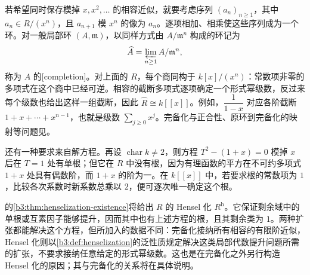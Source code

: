 \ProseParagraphBreak
若希望同时保存模掉 \(x,x^2,\ldots\) 的相容近似，就要考虑序列 \((a_n)_{n\ge1}\)，其中 \(a_n\in R/(x^n)\)，且 \(a_{n+1}\) 模 \(x^n\) 的像为 \(a_n\)。逐项相加、相乘使这些序列成为一个环。对一般局部环 \((A,\mathfrak m)\)，以同样方式由 \(A/\mathfrak m^n\) 构成的环记为
\[
	\widehat A=\varprojlim_{n\ge1} A/\mathfrak m^n,
\]
称为 \(A\) 的[completion]。对上面的 \(R\)，每个商同构于 \(k[x]/(x^n)\)：常数项非零的多项式在这个商中已经可逆。相容的截断多项式逐项确定一个形式幂级数，反过来每个级数也给出这样一组截断，因此 \(\widehat R\cong k[\![x]\!]\)。例如，\(\dfrac{1}{1-x}\) 对应各阶截断 \(1+x+\cdots+x^{n-1}\)，也就是级数 \(\sum_{j\ge0}x^j\)。完备化与正合性、原环到完备化的映射等问题见。

\ProseParagraphBreak
还有一种要求来自解方程。再设 \(\operatorname{char}k\ne2\)，则方程 \(T^2-(1+x)=0\) 模掉 \(x\) 后在 \(T=1\) 处有单根；但它在 \(R\) 中没有根，因为有理函数的平方在不可约多项式 \(1+x\) 处具有偶数阶，而 \(1+x\) 的阶为一。在 \(k[\![x]\!]\) 中，若要求根的常数项为 \(1\)，比较各次系数时新系数总乘以 \(2\)，便可逐次唯一确定这个根。

\ProseParagraphBreak
{}的\cref{b3:thm:henselization-existence}将给出 \(R\) 的 Hensel 化 \(R^{\mathrm h}\)。它保证剩余域中的单根或互素因子能够提升，因而其中也有上述方程的根，且其剩余类为 \(1\)。两种扩张都能解决这个方程，但所加入的数据不同：完备化接纳所有相容的有限阶近似，Hensel 化则以\cref{b3:def:henselization}的泛性质规定解决这类局部代数提升问题所需的扩张，不要求接纳任意给定的形式幂级数。这也是在完备化之外另行构造 Hensel 化的原因；其与完备化的关系将在具体说明。
